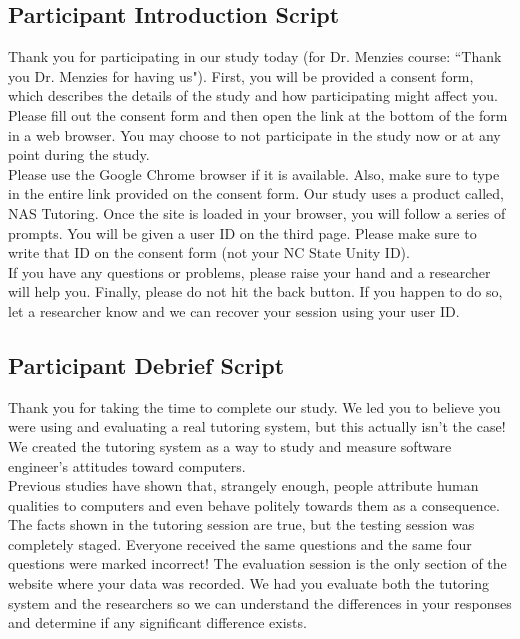 \documentclass{sig-alternate-05-2015}
\begin{document}
\subsection{Participant Introduction Script}

\noindent Thank you for participating in our study today (for Dr. Menzies course: ``Thank you Dr. Menzies for having us"). First, you will be provided a consent form, which describes the details of the study and how participating might affect you. Please fill out the consent form and then open the link at the bottom of the form in a web browser. You may choose to not participate in the study now or at any point during the study.\\

\noindent Please use the Google Chrome browser if it is available. Also, make sure to type in the entire link provided on the consent form. Our study uses a product called, NAS Tutoring. Once the site is loaded in your browser, you will follow a series of prompts. You will be given a user ID on the third page. Please make sure to write that ID on the consent form (not your NC State Unity ID).\\

\noindent If you have any questions or problems, please raise your hand and a researcher will help you. Finally, please do not hit the back button. If you happen to do so, let a researcher know and we can recover your session using your user ID.

\subsection{Participant Debrief Script}

\noindent Thank you for taking the time to complete our study. We led you to believe you were using and evaluating a real tutoring system, but this actually isn't the case! We created the tutoring system as a way to study and measure software engineer's attitudes toward computers.\\

\noindent Previous studies have shown that, strangely enough, people attribute human qualities to computers and even behave politely towards them as a consequence. The facts shown in the tutoring session are true, but the testing session was completely staged. Everyone received the same questions and the same four questions were marked incorrect! The evaluation session is the only section of the website where your data was recorded. We had you evaluate both the tutoring system and the researchers so we can understand the differences in your responses and determine if any significant difference exists. 
\end{document}
